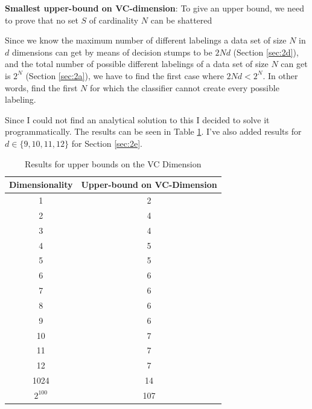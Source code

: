 \documentclass[11pt,a4paper]{article}
\begin{document}
\textbf{Smallest upper-bound on VC-dimension}: To give an upper bound, we need to prove that no set $S$ of cardinality $N$ can be shattered

Since we know the maximum number of different labelings a data set of size $N$ in $d$ dimensions can get by means of decision stumps to be $2Nd$ (Section \ref{sec:2d}), and the total number of possible different labelings of a data set of size $N$ can get is $2^N$ (Section \ref{sec:2a}), we have to find the first case where $2Nd < 2^N$. In other words, find the first $N$ for which the classifier cannot create every possible labeling.

Since I could not find an analytical solution to this I decided to solve it programmatically. The results can be seen in Table \ref{tab:upper-bound-vc}. I've also added results for $d \in \{9, 10, 11, 12\}$ for Section \ref{sec:2e}.

\begin{table}
    \centering
    \begin{tabular}{|c|c|}
    \hline
    Dimensionality & Upper-bound on VC-Dimension \\ \hline
    1              & 2                            \\ \hline
    2              & 4                            \\ \hline
    3              & 4                            \\ \hline
    4              & 5                            \\ \hline
    5              & 5                            \\ \hline
    6              & 6                            \\ \hline
    7              & 6                           \\ \hline
    8              & 6                            \\ \hline

    9              & 6                            \\ \hline
    10              & 7                            \\ \hline
    11             & 7                            \\ \hline
    12              & 7                            \\ \hline

    
    1024           & 14                            \\ \hline
    $2^{100}$        & 107 \\
    \hline
    \end{tabular}
    \caption{Results for upper bounds on the VC Dimension}
    \label{tab:upper-bound-vc}
\end{table}
\end{document}
